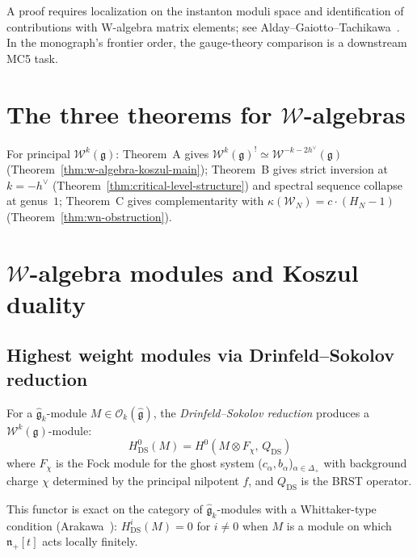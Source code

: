 \begin{remark}
A proof requires localization on the instanton moduli space and identification of contributions with W-algebra matrix elements; see Alday--Gaiotto--Tachikawa~\cite{AGT09}.  In the monograph's frontier order, the gauge-theory comparison is a downstream MC5 task.
\end{remark}


\section{The three theorems for $\mathcal{W}$-algebras}

\begin{remark}
\label{rem:w-algebra-three-theorems}
For principal $\mathcal{W}^k(\mathfrak{g})$:
Theorem~A gives $\mathcal{W}^k(\mathfrak{g})^! \simeq \mathcal{W}^{-k-2h^\vee}(\mathfrak{g})$ (Theorem~\ref{thm:w-algebra-koszul-main});
Theorem~B gives strict inversion at $k = -h^\vee$ (Theorem~\ref{thm:critical-level-structure}) and spectral sequence collapse at genus~$1$;
Theorem~C gives complementarity with $\kappa(\mathcal{W}_N) = c \cdot (H_N - 1)$ (Theorem~\ref{thm:wn-obstruction}).
\end{remark}

\section{$\mathcal{W}$-algebra modules and Koszul duality}
\label{sec:w-algebra-modules}

\subsection{Highest weight modules via Drinfeld--Sokolov reduction}

\begin{definition}
\label{def:w-module-ds}
For a $\widehat{\mathfrak{g}}_k$-module $M \in
\mathcal{O}_k(\widehat{\mathfrak{g}})$, the
\emph{Drinfeld--Sokolov reduction} produces a
$\mathcal{W}^k(\mathfrak{g})$-module:
\[
H^0_{\mathrm{DS}}(M) = H^0(M \otimes F_{\chi},\, Q_{\mathrm{DS}})
\]
where $F_\chi$ is the Fock module for the ghost system
($c_\alpha, b_\alpha$)$_{\alpha \in \Delta_+}$ with background charge
$\chi$ determined by the principal nilpotent $f$, and
$Q_{\mathrm{DS}}$ is the BRST operator.

This functor is exact on the category of $\widehat{\mathfrak{g}}_k$-modules
with a Whittaker-type condition (Arakawa~\cite{Arakawa17}): $H^i_{\mathrm{DS}}(M)
= 0$ for $i \neq 0$ when $M$ is a module on which
$\mathfrak{n}_+[t]$ acts locally finitely.
\end{definition}

